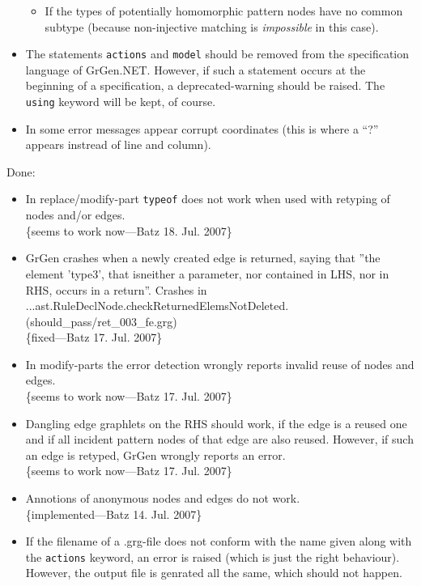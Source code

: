 \documentclass[12pt,a4paper]{article}
\begin{document}
\begin{itemize}
\begin{itemize}
			\item If the types of potentially homomorphic pattern nodes have no common subtype (because non-injective matching is \emph{impossible} in this case).
		\end{itemize}
	\item The statements {\tt actions} and {\tt model} should be removed from the specification language of GrGen.NET.
		However, if such a statement occurs at the beginning of a specification, a deprecated-warning should be raised.
		The {\tt using} keyword will be kept, of course.
	\item In some error messages appear corrupt coordinates (this is where a "`?"' appears instread of line and column).
\end{itemize}

\noindent
Done:
\begin{itemize}
	\item In replace/modify-part {\tt typeof} does not work when used with retyping of nodes and/or edges.\\
		\{seems to work now---Batz 18. Jul. 2007\}
    \item GrGen crashes when a newly created edge is returned, saying that ''the element 'type3', that isneither a parameter, nor contained in LHS, nor in RHS, occurs in a return''.
		Crashes in\\
		...ast.RuleDeclNode.checkReturnedElemsNotDeleted.\\
		(should\_pass/ret\_003\_fe.grg)\\
		\{fixed---Batz 17. Jul. 2007\}
	\item In modify-parts the error detection wrongly reports invalid reuse of nodes and edges.\\
		\{seems to work now---Batz 17. Jul. 2007\}
	\item Dangling edge graphlets on the RHS should work, if the edge is a reused one and if all incident pattern nodes of that edge are also reused.
    However, if such an edge is retyped, GrGen wrongly reports an error.\\
		\{seems to work now---Batz 17. Jul. 2007\}
	\item Annotions of anonymous nodes and edges do not work.\\
		\{implemented---Batz 14. Jul. 2007\}
	\item If the filename of a .grg-file does not conform with the name given along with the {\tt actions} keyword, an error is raised (which is just the right behaviour). However, the output file is genrated all the same, which should not happen.\\

\end{itemize}
\end{document}
